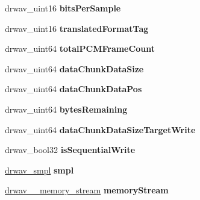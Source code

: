 \begin{DoxyCompactItemize}
\item 
\hypertarget{structdrwav_ab712d32dcc6b9c132ae43caf00827ea8}{drwav\-\_\-uint16 {\bfseries bits\-Per\-Sample}}\label{structdrwav_ab712d32dcc6b9c132ae43caf00827ea8}

\item 
\hypertarget{structdrwav_a842f721c6cd25a490163640b5e27e67e}{drwav\-\_\-uint16 {\bfseries translated\-Format\-Tag}}\label{structdrwav_a842f721c6cd25a490163640b5e27e67e}

\item 
\hypertarget{structdrwav_ac8e8a1d641a939c0509bdb8a66756305}{drwav\-\_\-uint64 {\bfseries total\-P\-C\-M\-Frame\-Count}}\label{structdrwav_ac8e8a1d641a939c0509bdb8a66756305}

\item 
\hypertarget{structdrwav_a9b86f18b7e61119b7cb1508b1fa7ad81}{drwav\-\_\-uint64 {\bfseries data\-Chunk\-Data\-Size}}\label{structdrwav_a9b86f18b7e61119b7cb1508b1fa7ad81}

\item 
\hypertarget{structdrwav_ac072363918628b9c86f785ef6d88989c}{drwav\-\_\-uint64 {\bfseries data\-Chunk\-Data\-Pos}}\label{structdrwav_ac072363918628b9c86f785ef6d88989c}

\item 
\hypertarget{structdrwav_adbaabf47d5befd4198937bb6232fe2ad}{drwav\-\_\-uint64 {\bfseries bytes\-Remaining}}\label{structdrwav_adbaabf47d5befd4198937bb6232fe2ad}

\item 
\hypertarget{structdrwav_a18f4fc049e3c11a30675289d74058522}{drwav\-\_\-uint64 {\bfseries data\-Chunk\-Data\-Size\-Target\-Write}}\label{structdrwav_a18f4fc049e3c11a30675289d74058522}

\item 
\hypertarget{structdrwav_a6e048af649de76096464bef56315f190}{drwav\-\_\-bool32 {\bfseries is\-Sequential\-Write}}\label{structdrwav_a6e048af649de76096464bef56315f190}

\item 
\hypertarget{structdrwav_ad59f1f3335ae2691b51444e7ed4d4f29}{\hyperlink{structdrwav__smpl}{drwav\-\_\-smpl} {\bfseries smpl}}\label{structdrwav_ad59f1f3335ae2691b51444e7ed4d4f29}

\item 
\hypertarget{structdrwav_a6bffd178879c0016be00a08b124fa976}{\hyperlink{structdrwav____memory__stream}{drwav\-\_\-\-\_\-memory\-\_\-stream} {\bfseries memory\-Stream}}\label{structdrwav_a6bffd178879c0016be00a08b124fa976}


\end{DoxyCompactItemize}
